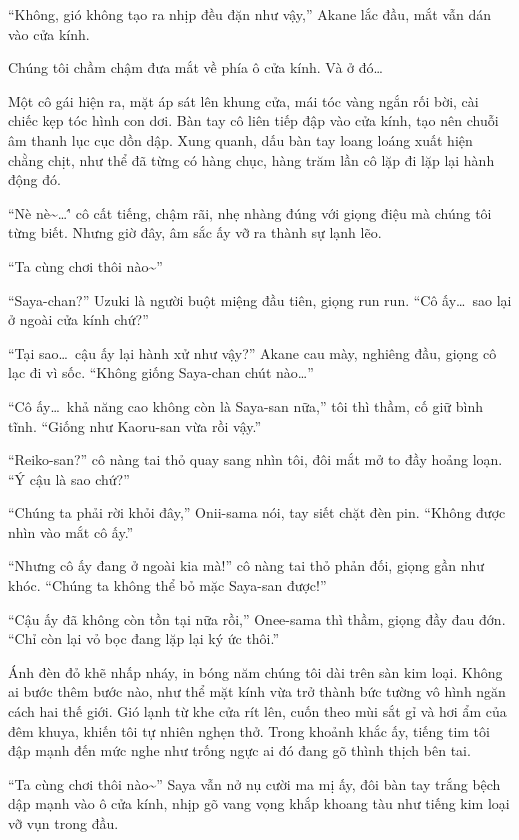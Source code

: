 \documentclass[../main.tex]{subfiles}
\begin{document}
``Không, gió không tạo ra nhịp đều đặn như vậy,'' Akane lắc đầu, mắt vẫn dán vào cửa kính.

Chúng tôi chầm chậm đưa mắt về phía ô cửa kính. Và ở đó\dots

Một cô gái hiện ra, mặt áp sát lên khung cửa, mái tóc vàng ngắn rối bời, cài chiếc kẹp tóc hình con dơi. Bàn tay cô liên tiếp đập vào cửa kính, tạo nên chuỗi âm thanh lục cục dồn dập. Xung quanh, dấu bàn tay loang loáng xuất hiện chằng chịt, như thể đã từng có hàng chục, hàng trăm lần cô lặp đi lặp lại hành động đó.

``Nè nè\~{}\dots\'' cô cất tiếng, chậm rãi, nhẹ nhàng đúng với giọng điệu mà chúng tôi từng biết. Nhưng giờ đây, âm sắc ấy vỡ ra thành sự lạnh lẽo.

``Ta cùng chơi thôi nào\~{}''


``Saya-chan?'' Uzuki là người buột miệng đầu tiên, giọng run run. ``Cô ấy\dots\ sao lại ở ngoài cửa kính chứ?''

``Tại sao\dots\ cậu ấy lại hành xử như vậy?'' Akane cau mày, nghiêng đầu, giọng cô lạc đi vì sốc.
``Không giống Saya-chan chút nào\dots''

``Cô ấy\dots\ khả năng cao không còn là Saya-san nữa,'' tôi thì thầm, cố giữ bình tĩnh. ``Giống như Kaoru-san vừa rồi vậy.''

``Reiko-san?'' cô nàng tai thỏ quay sang nhìn tôi, đôi mắt mở to đầy hoảng loạn. ``Ý cậu là sao chứ?''

``Chúng ta phải rời khỏi đây,'' Onii-sama nói, tay siết chặt đèn pin. ``Không được nhìn vào mắt cô ấy.''

``Nhưng cô ấy đang ở ngoài kia mà!'' cô nàng tai thỏ phản đối, giọng gần như khóc. ``Chúng ta không thể bỏ mặc Saya-san được!''

``Cậu ấy đã không còn tồn tại nữa rồi,'' Onee-sama thì thầm, giọng đầy đau đớn. ``Chỉ còn lại vỏ bọc đang lặp lại ký ức thôi.''

Ánh đèn đỏ khẽ nhấp nháy, in bóng năm chúng tôi dài trên sàn kim loại. Không ai bước thêm bước nào, như thể mặt kính vừa trở thành bức tường vô hình ngăn cách hai thế giới. Gió lạnh từ khe cửa rít lên, cuốn theo mùi sắt gỉ và hơi ẩm của đêm khuya, khiến tôi tự nhiên nghẹn thở. Trong khoảnh khắc ấy, tiếng tim tôi đập mạnh đến mức nghe như trống ngực ai đó đang gõ thình thịch bên tai.

``Ta cùng chơi thôi nào\~{}'' Saya vẫn nở nụ cười ma mị ấy, đôi bàn tay trắng bệch dập mạnh vào ô cửa kính, nhịp gõ vang vọng khắp khoang tàu như tiếng kim loại vỡ vụn trong đầu.
\end{document}

